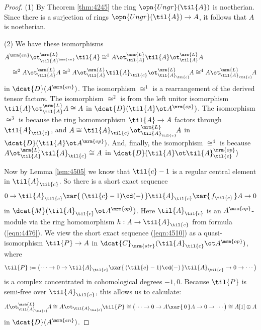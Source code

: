 \begin{proof} \mbox{}

\smallskip \noindent
(1) By Theorem \ref{thm:4245} the ring $\opn{Ungr}(\til{A})$ is noetherian. 
Since there is a surjection of rings $\opn{Ungr}(\til{A}) \to A$, it follows 
that $A$ is noetherian. 

\medskip \noindent 
(2) We have these isomorphisms 
\[ \begin{aligned}
&
A^{\mrm{en}} \ot^{\mrm{L}}_{\til{A}^{\mrm{en}}} \til{A}
\cong^1 A \ot^{\mrm{L}}_{\til{A}} \til{A} \ot^{\mrm{L}}_{\til{A}} A
\\[0.3em] & \quad 
\cong^2 A \ot^{\mrm{L}}_{\til{A}} A
\cong^3 A \ot^{\mrm{L}}_{\til{A}} \til{A}_{\til{c}} 
\ot^{\mrm{L}}_{\til{A}_{\til{c}}} \! A 
\cong^4 A \ot^{\mrm{L}}_{\til{A}_{\til{c}}} \! A 
\end{aligned} \]
in $\dcat{D}(A^{\mrm{en}})$. 
The isomorphism $\cong^1$ is a rearrangement of the derived tensor factors. 
The isomorphism $\cong^2$ is from the left unitor isomorphism
$\til{A} \ot^{\mrm{L}}_{\til{A}} A \cong A$ in 
$\dcat{D}(\til{A} \ot A^{\mrm{op}})$. The isomorphism $\cong^3$
is because the ring homomorphism $\til{A} \to A$ factors through  
$\til{A}_{\til{c}}$, and 
$A \cong \til{A}_{\til{c}} \ot^{\mrm{L}}_{\til{A}_{\til{c}}} \! A$
in $\dcat{D}(\til{A} \ot A^{\mrm{op}})$. And, finally, the  
isomorphism $\cong^4$ is because 
$A \ot^{\mrm{L}}_{\til{A}} \til{A}_{\til{c}} \cong A$ in 
$\dcat{D}(\til{A} \ot \til{A}_{\til{c}}^{\mrm{op}})$

Now by Lemma \ref{lem:4505} 
we know that ${\til{c}} - 1$ is a regular central element in 
$\til{A}_{\til{c}}$. So there is a short exact sequence 
\begin{equation} \label{eqn:4510}
0 \to \til{A}_{\til{c}} \xar{\, (\til{c} - 1) \cd (-) \, } 
\til{A}_{\til{c}} \xar{ \, f_{\til{c}} \, } A \to  0
\end{equation}
in $\dcat{M}(\til{A}_{\til{c}} \ot A^{\mrm{op}})$. 
Here $\til{A}_{\til{c}}$ is an $A^{\mrm{op}}$-module via the ring homomorphism 
$h : A \to \til{A}_{\til{c}}$ from formula (\ref{eqn:4476}). We view the short 
exact sequence (\ref{eqn:4510}) as a quasi-isomorphism $\til{P} \to A$ in 
$\dcat{C}_{\mrm{str}}(\til{A}_{\til{c}} \ot A^{\mrm{op}})$,
where 
\[ \til{P} := \bigl( \cdots \to 0 \to 
\til{A}_{\til{c}} \xar{\, (\til{c} - 1) \cd (-) \, } 
\til{A}_{\til{c}} \to  0 \to \cdots \bigr) \]
is a complex concentrated in cohomological degrees $-1, 0$. 
Because $\til{P}$ is semi-free over $\til{A}_{\til{c}}$, this allows us to 
calculate: 
\[ A \ot^{\mrm{L}}_{\til{A}_{\til{c}}} \! A \cong A 
\ot_{\til{A}_{\til{c}}} \! \til{P}  \cong 
\bigl( \cdots \to 0 \to A \xar{ \,0 \, } A \to 0 \to \cdots \bigr) \cong A[1] 
\oplus A \]
in $\dcat{D}(A^{\mrm{en}})$.


\end{proof}
